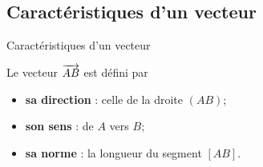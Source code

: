 \documentclass[11pt]{article}
\begin{document}
\subsection{Caractéristiques d'un vecteur}
\begin{defi}{Caractéristiques d'un vecteur}
  \begin{minipage}{.5\textwidth}
  Le vecteur $\overrightarrow{AB}$ est défini par
  \begin{itemize}
    \item \textbf{sa direction} : celle de la droite $\left( AB \right)$;
    \item \textbf{son sens} : de $A$ vers $B$;
    \item \textbf{sa norme} : la longueur du segment $\left[ AB \right]$.
  \end{itemize}
  \end{minipage}
  \begin{minipage}{.5\textwidth}
  \begin{center}
  \end{center}
  \end{minipage}
\end{defi}
\end{document}
